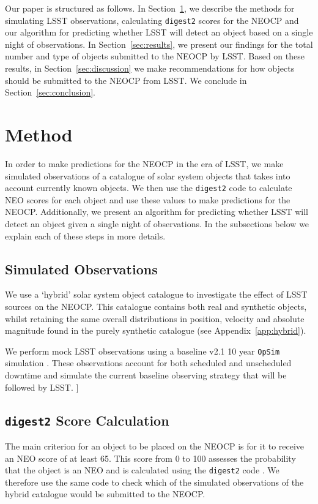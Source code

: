 \documentclass[twocolumn]{aastex631}
\newcommand{\todo}[1]{{\color{red}{[TODO: #1}]}}
\newcommand{\dig}{\texttt{digest2}}
\begin{document}
Our paper is structured as follows. In Section~\ref{sec:method}, we describe the methods for simulating LSST observations, calculating \dig{} scores for the NEOCP and our algorithm for predicting whether LSST will detect an object based on a single night of observations. In Section~\ref{sec:results}, we present our findings for the total number and type of objects submitted to the NEOCP by LSST. Based on these results, in Section~\ref{sec:discussion} we make recommendations for how objects should be submitted to the NEOCP from LSST. We conclude in Section~\ref{sec:conclusion}.

\section{Method} \label{sec:method}
In order to make predictions for the NEOCP in the era of LSST, we make simulated observations of a catalogue of solar system objects that takes into account currently known objects. We then use the \dig{} code to calculate NEO scores for each object and use these values to make predictions for the NEOCP. Additionally, we present an algorithm for predicting whether LSST will detect an object given a single night of observations. In the subsections below we explain each of these steps in more details.

\subsection{Simulated Observations}
We use a `hybrid' solar system object catalogue to investigate the effect of LSST sources on the NEOCP. This catalogue contains both real and synthetic objects, whilst retaining the same overall distributions in position, velocity and absolute magnitude found in the purely synthetic catalogue (see Appendix~\ref{app:hybrid}).

We perform mock LSST observations using a baseline v2.1 10 year \texttt{OpSim} simulation \citep{opsim, Cornwall+2020}. These observations account for both scheduled and unscheduled downtime and simulate the current baseline observing strategy that will be followed by LSST. \todo{Mario should check this because I don't know what I'm talking about}

\subsection{\dig{} Score Calculation}\label{sec:digest2_score}
The main criterion for an object to be placed on the NEOCP is for it to receive an NEO score of at least 65. This score from 0 to 100 assesses the probability that the object is an NEO and is calculated using the \dig{} code \citep{Keys+2019}. We therefore use the same code to check which of the simulated observations of the hybrid catalogue would be submitted to the NEOCP.
\end{document}
